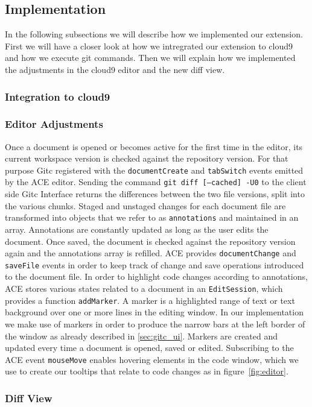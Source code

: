 \subsection{Implementation}
In the following subsections we will describe how we implemented our extension.
First we will have a closer look at how we intregrated our extension to cloud9 and how we execute git commands.
Then we will explain how we implemented the adjustments in the cloud9 editor and the new diff view.

\subsubsection{Integration to cloud9}

\subsubsection{Editor Adjustments}

Once a document is opened or becomes active for the first time in the editor, its current workspace version is checked against the repository version. For that purpose Gitc registered with the \texttt{documentCreate} and \texttt{tabSwitch} events emitted by the ACE editor. Sending the command \texttt{git diff [--cached] -U0} to the client side Gitc Interface returns the differences between the two file versions, split into the various chunks. Staged and unstaged changes for each document file are transformed into objects that we refer to as \texttt{annotations} and maintained in an array. Annotations are constantly updated as long as the user edits the document. Once saved, the document is checked against the repository version again and the annotations array is refilled. ACE provides \texttt{documentChange} and \texttt{saveFile} events in order to keep track of change and save operations introduced to the document file. In order to highlight code changes according to annotations, ACE stores various states related to a document in an \texttt{EditSession}, which provides a function \texttt{addMarker}. A marker is a highlighted range of text or text background over one or more lines in the editing window. In our implementation we make use of markers in order to produce the narrow bars at the left border of the window as already described in \ref{sec:gitc_ui}. Markers are created and updated every time a document is opened, saved or edited. Subscribing to the ACE event \texttt{mouseMove} enables hovering elements in the code window, which we use to create our tooltips that relate to code changes as in figure~\ref{fig:editor}.

\subsubsection{Diff View}
